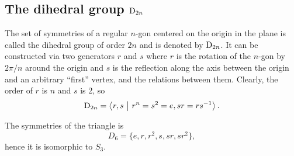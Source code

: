 \subsection{The dihedral group $\text{D}_{2n}$}

	The set of symmetries of a regular $n$-gon centered on the origin in the plane is called the dihedral group of order $2n$ and is denoted by $\text{D}_{2n}$. It can be constructed via two generators $r$ and $s$ where $r$ is the rotation of the $n$-gon by $2\pi/n$ around the origin and $s$ is the reflection along the axis between the origin and an arbitrary ``first'' vertex, and the relations between them. Clearly, the order of $r$ is $n$ and $s$ is 2, so
	\[
		\D_{2n} = \left\langle r,s \ \middle\vert \ r^n = s^2 = e, sr = rs^{-1} \right\rangle.
	\] 
	
	\begin{example}
		The symmetries of the triangle is
		\[
		D_6 = \{ e, r, r^2, s, sr, sr^2 \},
		\]
		hence it is isomorphic to $S_3$.
	\end{example}
	
	